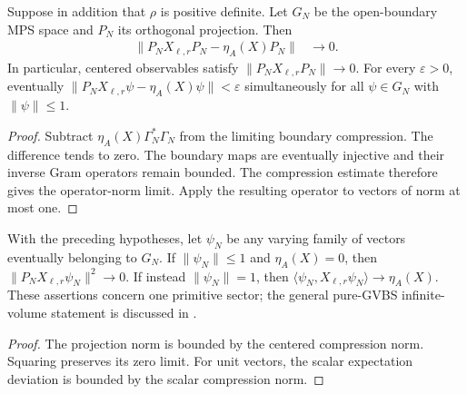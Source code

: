 \begin{lemma}
    \label{thm:primitive_bulk_ground_compression}
    \leanok
    Suppose in addition that $\rho$ is positive definite. Let $G_N$ be the
    open-boundary MPS space and $P_N$ its orthogonal projection. Then
    \begin{align}
        \|P_NX_{\ell,r}P_N-\eta_A(X)P_N\| & \longrightarrow0.
    \end{align}
    In particular, centered observables satisfy
    $\|P_NX_{\ell,r}P_N\|\to0$. For every $\varepsilon>0$, eventually
    $\|P_NX_{\ell,r}\psi-\eta_A(X)\psi\|<\varepsilon$ simultaneously
    for all $\psi\in G_N$ with $\|\psi\|\leq1$.
\end{lemma}
\begin{proof}\leanok
    Subtract $\eta_A(X)\Gamma_N^*\Gamma_N$ from the limiting boundary
    compression. The difference tends to zero. The boundary maps are
    eventually injective and their inverse Gram operators remain bounded.
    The compression estimate therefore gives the operator-norm limit.
    Apply the resulting operator to vectors of norm at most one.
\end{proof}

\begin{lemma}
    \label{thm:primitive_bulk_ground_vector_limits}
    \leanok
    With the preceding hypotheses, let $\psi_N$ be any varying family of
    vectors eventually belonging to $G_N$. If $\|\psi_N\|\leq1$ and
    $\eta_A(X)=0$, then $\|P_NX_{\ell,r}\psi_N\|^2\to0$.
    If instead $\|\psi_N\|=1$, then
    $\langle\psi_N,X_{\ell,r}\psi_N\rangle\to\eta_A(X)$.
    These assertions concern one primitive sector; the general pure-GVBS
    infinite-volume statement is discussed in
    \cite{gap:nachtergaele96_infinite_volume_ground_projection}.
\end{lemma}
\begin{proof}\leanok
    The projection norm is bounded by the centered compression norm.
    Squaring preserves its zero limit. For unit vectors, the scalar
    expectation deviation is bounded by the scalar compression norm.
\end{proof}

